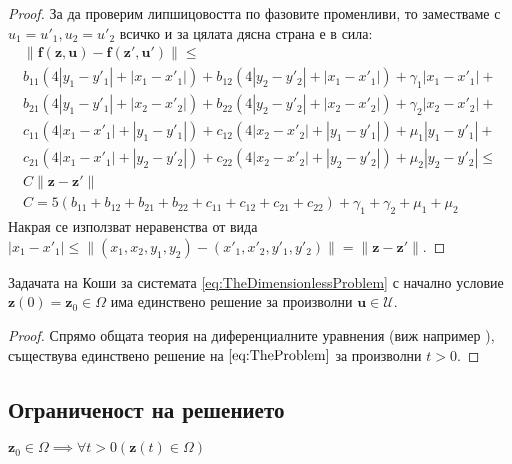 \begin{proof}
  За да проверим липшицовостта по фазовите променливи, то заместваме с $u_1 = u'_1, u_2 = u'_2$ всичко и за цялата дясна страна е в сила:
  \begin{multline}
  \label{eq:LipschitzContinuity}
    \|\mathbf{f}(\mathbf{z}, \mathbf{u}) - \mathbf{f}(\mathbf{z}', \mathbf{u}')\| \leq \\
    b_{11} (4 |y_1 - y'_1| + |x_1 - x'_1|) +
    b_{12} (4 |y_2 - y'_2| + |x_1 - x'_1|) + \gamma_1 |x_1-x'_1| + \\
    b_{21} (4 |y_1 - y'_1| + |x_2 - x'_2|) +
    b_{22} (4 |y_2 - y'_2| + |x_2 - x'_2|) + \gamma_2 |x_2-x'_2| + \\
    c_{11} (4 |x_1 - x'_1| + |y_1 - y'_1|) +
    c_{12} (4 |x_2 - x'_2| + |y_1 - y'_1|) + \mu_1 |y_1 - y'_1| + \\
    c_{21} (4 |x_1 - x'_1| + |y_2 - y'_2|) +
    c_{22} (4 |x_2 - x'_2| + |y_2 - y'_2|) + \mu_2 |y_2 - y'_2| \leq \\
    C \|\mathbf{z} - \mathbf{z}'\| \\
    C = 5 (b_{11} + b_{12} + b_{21} + b_{22} + c_{11} + c_{12} + c_{21} + c_{22}) + \gamma_1 + \gamma_2 + \mu_1 + \mu_2
  \end{multline}
  Накрая се използват неравенства от вида $|x_1-x'_1| \leq \|(x_1, x_2, y_1, y_2) - (x'_1, x'_2, y'_1, y'_2)\| = \|\mathbf{z} - \mathbf{z}'\|$.
\end{proof}

\begin{corollary}
\label{cor:ExistanceAndUniqueness}
  Задачата на Коши за системата \eqref{eq:TheDimensionlessProblem} с начално условие $\mathbf{z}(0)=\mathbf{z}_0 \in \Omega$ има единствено решение за произволни $\mathbf{u} \in \mathscr{U}$.
\end{corollary}

\begin{proof}
  Спрямо общата теория на диференциалните уравнения (виж например \cite[глава~I]{Hale1980}), съществува единствено решение на $\eqref{eq:TheProblem}$ за произволни $t>0$.
\end{proof}

\subsection{Ограниченост на решението}

\begin{proposition}
  $\mathbf{z}_0 \in \Omega \implies \forall{t>0}\left(\mathbf{z}(t) \in \Omega\right)$
\end{proposition}

